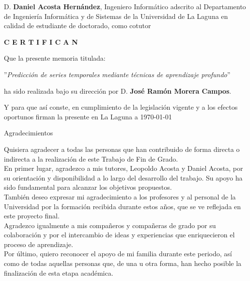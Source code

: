 \documentclass[spanish,a4paper,12pt,oneside]{extreport}
\begin{document}
\bigskip
D. {\bf Daniel Acosta Hernández}, Ingeniero Informático adscrito al Departamento de Ingeniería Informática y de Sistemas de la Universidad de La Laguna en calidad de estudiante de doctorado, como cotutor

\pagestyle{empty}

\bigskip
\bigskip
{\bf C E R T I F I C A N}

\bigskip
\bigskip
Que la presente memoria titulada:

\bigskip
''{\it Predicción de series temporales mediante técnicas de aprendizaje profundo}''

\bigskip
\bigskip
\bigskip

\noindent ha sido realizada bajo su dirección por D. {\bf José Ramón Morera Campos}.

\bigskip
\bigskip

Y para que así conste, en cumplimiento de la legislación vigente y a los efectos
oportunos firman la presente en La Laguna a \today

\newpage
\thispagestyle{empty}

{ \begin{LARGE}
Agradecimientos
\end{LARGE}

\hspace{3mm}

\begin{large}
Quisiera agradecer a todas las personas que han contribuido de forma directa o indirecta a la realización de este Trabajo de Fin de Grado. \\

En primer lugar, agradezco a mis tutores, Leopoldo Acosta y Daniel Acosta, por su orientación y disponibilidad a lo largo del desarrollo del trabajo. 
Su apoyo ha sido fundamental para alcanzar los objetivos propuestos. \\

También deseo expresar mi agradecimiento a los profesores y al personal de la Universidad por la formación recibida durante estos años, que se ve reflejada en este proyecto final. \\

Agradezco igualmente a mis compañeros y compañeras de grado por su colaboración y por el intercambio de ideas y experiencias que enriquecieron el proceso de aprendizaje. \\

Por último, quiero reconocer el apoyo de mi familia durante este periodo, así como de todas aquellas personas que, de una u otra forma, han hecho posible la finalización de esta etapa académica. \\
\end{large}

}
\newpage
\thispagestyle{empty}
\end{document}
